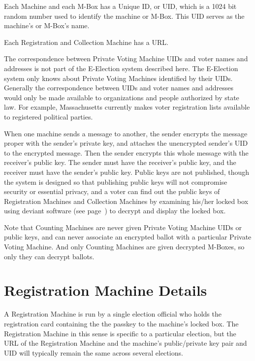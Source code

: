 \documentclass[12pt]{article}
\newcommand{\pagref}[1]{(see page~\pageref{#1})}
\begin{document}
Each Machine and each M-Box
has a Unique ID, or UID, which is a 1024 bit random number
used to identify the machine or M-Box.  This UID serves as the
machine's or M-Box's name.

Each Registration and Collection Machine has a URL.

The correspondence between Private Voting Machine UIDs
and voter names and addresses is not part of the E-Election system
described here.  The E-Election system only knows about
Private Voting Machines identified by their UIDs.
Generally the correspondence between UIDs and voter names and addresses
would only be made available
to organizations and people authorized by state law.
For example, Massachusetts currently makes voter registration lists
available to registered political parties.

When one machine sends a message to another, the sender
encrypts the message proper with the sender's private
key, and attaches the unencrypted sender's UID to the
encrypted message.  Then the sender encrypts this whole message with the
receiver's public key.  The sender must have the receiver's
public key, and the receiver must have the sender's public
key.  Public keys are not published,
though the system is designed so that publishing public
keys will not compromise security or essential privacy,
and a voter can find out the public keys of Registration
Machines and Collection Machines by examining his/her locked
box using deviant software \pagref{DEVIANT-SOFTWARE} to decrypt and
display the locked box.

Note that Counting Machines are never given Private Voting
Machine UIDs or public keys, and can never associate an
encrypted ballot with a particular Private Voting Machine.
And only Counting Machines are given decrypted M-Boxes, so
only they can decrypt ballots.

\section{Registration Machine Details}

A Registration Machine is run by a single election official
who holds the registration card containing the the passkey to
the machine's locked box.  The Registration Machine in this
sense is specific to a particular election, but the
URL of the Registration Machine and the machine's
public/private key pair and UID will typically remain the same across
several elections.
\end{document}
